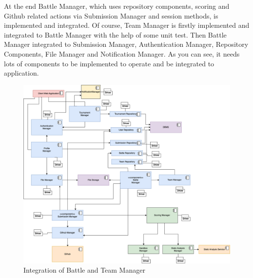 \newpage
\indent At the end Battle Manager, which uses repository components, scoring and Github related actions via Submission Manager and session methods, is implemented and integrated. Of course, Team Manager is firstly implemented and integrated to Battle Manager with the help of  some unit test. Then Battle Manager integrated to Submission Manager, Authentication Manager, Repository Components, File Manager and Notification Manager. As you can see, it needs lots of components to be implemented to  operate and be integrated to application. 

\begin{figure}[H]
    \centering
    \includegraphics[width=\linewidth]{Images/integration/integration_9.drawio.png}
    \caption{Integration of Battle and Team Manager}
\end{figure}

\newpage
